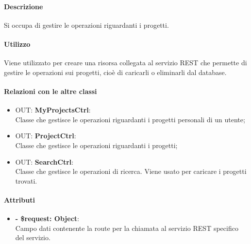		\paragraph{Descrizione}
		Si occupa di gestire le operazioni riguardanti i progetti.
		
		\paragraph{Utilizzo}
		Viene utilizzato per creare una risorsa collegata al servizio \gls{REST} che permette di gestire le operazioni sui progetti, cioè di caricarli o eliminarli dal \gls{database}.
		
		\paragraph{Relazioni con le altre classi}
		\begin{itemize}
			\item OUT: \textbf{MyProjectsCtrl}:\\
			Classe che gestisce le operazioni riguardanti i progetti personali di un utente;
			\item OUT: \textbf{ProjectCtrl}:\\
			Classe che gestisce le operazioni riguardanti i progetti;
			\item OUT: \textbf{SearchCtrl}:\\
			Classe che gestisce le operazioni di ricerca. Viene usato per caricare i progetti trovati.
		\end{itemize}
		
		\paragraph{Attributi}
		\begin{itemize}
			\item \textbf{- \$request: Object}:\\
			Campo dati contenente la route per la chiamata al servizio \gls{REST} specifico del servizio.
		\end{itemize}	
		
